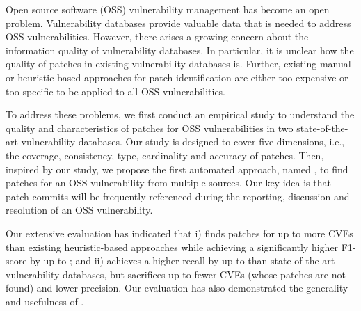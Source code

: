 \begin{abstract*}
Open source software (OSS) vulnerability management has become an open problem. Vulnerability databases provide valuable data that is needed to address OSS vulnerabilities. However, there arises a growing concern about the information quality of vulnerability databases. In particular, it is unclear how the quality of patches in existing vulnerability databases is. Further, existing manual or heuristic-based approaches for patch identification are either too expensive or too specific to be applied to all OSS vulnerabilities.

To address these problems, we first conduct an empirical study to understand the quality and characteristics of patches for OSS vulnerabilities in two state-of-the-art vulnerability databases. Our study is designed to cover five dimensions, i.e., the coverage, consistency, type, cardinality and accuracy of patches. Then, inspired by our study, we propose the first automated approach, named \tool, to find patches for an OSS vulnerability from multiple sources. Our key idea is that patch commits will be frequently referenced during the reporting, discussion and resolution of an OSS vulnerability.

Our extensive evaluation has indicated that i) \tool finds patches for up to  more CVEs than existing heuristic-based approaches while achieving a significantly higher F1-score by up to ; and ii) \tool achieves a higher recall by up to  than state-of-the-art vulnerability databases, but sacrifices up to  fewer CVEs (whose patches are not found) and  lower precision. Our evaluation has also demonstrated the generality and usefulness of \tool.
\end{abstract*}